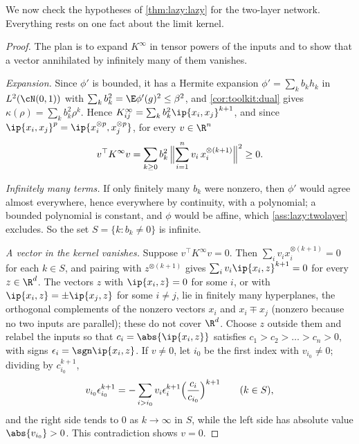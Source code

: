 \begin{refsection}
We now check the hypotheses of \cref{thm:lazy:lazy} for the two-layer network. Everything rests on one fact about the limit kernel.


\begin{proof}
The plan is to expand $K^\infty$ in tensor powers of the inputs and to show that a vector annihilated by infinitely many of them vanishes.

\emph{Expansion.} Since $\phi'$ is bounded, it has a Hermite expansion $\phi'=\sum_kb_kh_k$ in $L^2(\cN(0,1))$ with $\sum_kb_k^2=\E\phi'(g)^2\le\beta^2$, and \cref{cor:toolkit:dual} gives $\kappa(\rho)=\sum_kb_k^2\rho^k$. Hence $K^\infty_{ij}=\sum_kb_k^2\ip{x_i,x_j}^{k+1}$, and since $\ip{x_i,x_j}^{p}=\ip{x_i^{\otimes p},x_j^{\otimes p}}$, for every $v\in\R^n$
\[
  v^\top K^\infty v=\sum_{k\ge0}b_k^2\,\Bigl\|\sum_{i=1}^nv_i\,x_i^{\otimes(k+1)}\Bigr\|^2\ge0 .
\]

\emph{Infinitely many terms.} If only finitely many $b_k$ were nonzero, then $\phi'$ would agree almost everywhere, hence everywhere by continuity, with a polynomial; a bounded polynomial is constant, and $\phi$ would be affine, which \cref{ass:lazy:twolayer} excludes. So the set $S=\{k\colon b_k\ne0\}$ is infinite.

\emph{A vector in the kernel vanishes.} Suppose $v^\top K^\infty v=0$. Then $\sum_iv_ix_i^{\otimes(k+1)}=0$ for each $k\in S$, and pairing with $z^{\otimes(k+1)}$ gives $\sum_iv_i\ip{x_i,z}^{k+1}=0$ for every $z\in\R^d$. The vectors $z$ with $\ip{x_i,z}=0$ for some $i$, or with $\ip{x_i,z}=\pm\ip{x_j,z}$ for some $i\ne j$, lie in finitely many hyperplanes, the orthogonal complements of the nonzero vectors $x_i$ and $x_i\mp x_j$ (nonzero because no two inputs are parallel); these do not cover $\R^d$. Choose $z$ outside them and relabel the inputs so that $c_i=\abs{\ip{x_i,z}}$ satisfies $c_1>c_2>\dots>c_n>0$, with signs $\epsilon_i=\sgn\ip{x_i,z}$. If $v\ne0$, let $i_0$ be the first index with $v_{i_0}\ne0$; dividing by $c_{i_0}^{k+1}$,
\[
  v_{i_0}\epsilon_{i_0}^{k+1}=-\sum_{i>i_0}v_i\epsilon_i^{k+1}\Bigl(\frac{c_i}{c_{i_0}}\Bigr)^{k+1}\qquad(k\in S),
\]
and the right side tends to $0$ as $k\to\infty$ in $S$, while the left side has absolute value $\abs{v_{i_0}}>0$. This contradiction shows $v=0$.
\end{proof}


\end{refsection}
